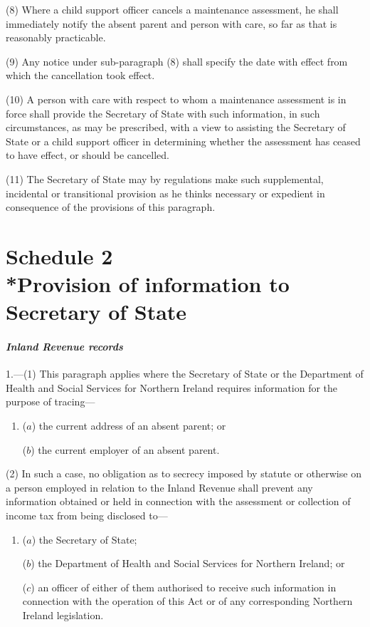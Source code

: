 \documentclass[12pt,a4paper]{article}
\begin{document}
(8) Where a child support officer cancels a maintenance assessment, he shall immediately notify the absent parent and person with care, so far as that is reasonably practicable.

(9) Any notice under sub-paragraph (8)  shall specify the date with effect from which the cancellation took effect.

(10) A person with care with respect to whom a maintenance assessment is in force shall provide the Secretary of State with such information, in such circumstances, as may be prescribed, with a view to assisting the Secretary of State or a child support officer in determining whether the assessment has ceased to have effect, or should be cancelled.

(11) The Secretary of State may by regulations make such supplemental, incidental or transitional provision as he thinks necessary or expedient in consequence of the provisions of this paragraph.


\part[Schedule 2 --- Provision of information to Secretary of State]{Schedule 2\\*Provision of information to Secretary of State}

\renewcommand\parthead{--- Schedule 2}

\subsection*{\itshape Inland Revenue records}

1.---(1) This paragraph applies where the Secretary of State or the Department of Health and Social Services for Northern Ireland requires information for the purpose of tracing—
\begin{enumerate}\item[]
($a$) the current address of an absent parent; or

($b$) the current employer of an absent parent.
\end{enumerate}

(2) In such a case, no obligation as to secrecy imposed by statute or otherwise on a person employed in relation to the Inland Revenue shall prevent any information obtained or held in connection with the assessment or collection of income tax from being disclosed to—
\begin{enumerate}\item[]
($a$) the Secretary of State;

($b$) the Department of Health and Social Services for Northern Ireland; or

($c$) an officer of either of them authorised to receive such information in connection with the operation of this Act or of any corresponding Northern Ireland legislation.
\end{enumerate}
\end{document}
